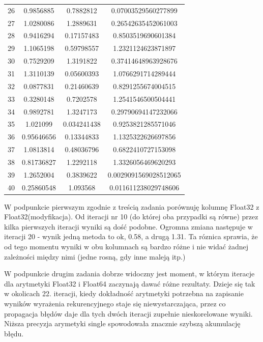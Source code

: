 \documentclass[8pt,letterpaper]{article}
\begin{document}
\begin{center}
\begin{tabular}{|c|c|c|c|}
26 & 0.9856885 & 0.7882812 & 0.07003529560277899 \\
27 & 1.0280086 & 1.2889631 & 0.26542635452061003 \\
28 & 0.9416294 & 0.17157483 & 0.8503519690601384 \\
29 & 1.1065198 & 0.59798557 & 1.2321124623871897 \\
30 & 0.7529209 & 1.3191822 & 0.37414648963928676 \\
31 & 1.3110139 & 0.05600393 & 1.0766291714289444 \\
32 & 0.0877831 & 0.21460639 & 0.8291255674004515 \\
33 & 0.3280148 & 0.7202578 & 1.2541546500504441 \\
34 & 0.9892781 & 1.3247173 & 0.29790694147232066 \\
35 & 1.021099 & 0.034241438 & 0.9253821285571046 \\
36 & 0.95646656 & 0.13344833 & 1.1325322626697856 \\
37 & 1.0813814 & 0.48036796 & 0.6822410727153098 \\
38 & 0.81736827 & 1.2292118 & 1.3326056469620293 \\
39 & 1.2652004 & 0.3839622 & 0.0029091569028512065 \\
40 & 0.25860548 & 1.093568 & 0.011611238029748606 \\
	\hline

\end{tabular}
\end{center}

\hspace{1.0 cm} W podpunkcie pierwszym zgodnie z treścią zadania porównuję kolumnę Float32 z Float32(modyfikacja). Od iteracji nr 10 (do której oba przypadki są równe) przez kilka pierwszych iteracji wyniki są dość podobne. Ogromna zmiana następuje w iteracji 20 - wynik jedną metoda to ok, 0.58, a drugą 1.31. Ta róznica sprawia, że od tego momentu wyniki w obu kolumnach są bardzo różne i nie widać żadnej zależności między nimi (jedne rosną, gdy inne maleją itp.)

\hspace{1.0 cm} W podpunkcie drugim zadania dobrze widoczny jest moment, w którym iteracje dla arytmetyki Float32 i Float64 zaczynają dawać różne rezultaty. Dzieje się tak w okolicach 22. iteracji, kiedy dokładność arytmetyki potrzebna na zapisanie wyników wyrażenia rekurencyjnego staje się niewystarczająca, przez co propagacja błędów daje dla tych dwóch iteracji zupełnie nieskorelowane wyniki. Niższa precyzja arymetyki single spowodowała znacznie szybszą akumulację błędu.
\end{document}
